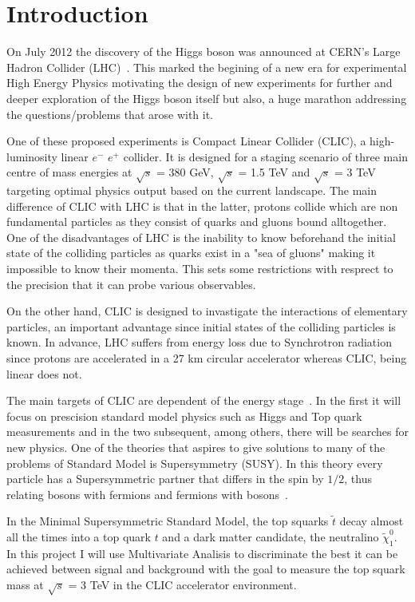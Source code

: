 \documentclass[12pt,a4paper]{report}
\begin{document}
\chapter{Introduction}

On July 2012 the discovery of the Higgs boson was announced at CERN's Large Hadron Collider (LHC)~\cite{aad2012observation}. 
This marked the begining of a new era for experimental High Energy Physics motivating the design of new 
experiments for further and deeper exploration of the Higgs boson itself but also, a huge marathon
addressing the questions/problems that arose with it. 

One of these proposed experiments is Compact Linear Collider (CLIC), a high-luminosity linear $e^{-}$ $e^{+}$ collider. It is designed for a staging scenario of three main centre of mass energies at $\surd{s}$ = 380 GeV, $\surd{s}$ = 1.5 TeV
and $\surd{s}$ = 3 TeV targeting optimal physics output based on the current landscape. The main difference of CLIC with LHC is that in the latter, protons collide which are non fundamental particles as they consist of quarks and 
gluons bound alltogether. One of the disadvantages of LHC is the inability to know beforehand the initial state of the colliding particles as quarks exist in a "sea of gluons" making it impossible to know their momenta. This sets
some restrictions with resprect to the precision that it can probe various observables.

On the other hand, CLIC is designed to invastigate the interactions of elementary particles, an important advantage since initial states of the colliding particles is known. In advance, LHC suffers from energy loss due to 
Synchrotron radiation since protons are accelerated in a 27 km circular accelerator whereas CLIC, being linear does not.

The main targets of CLIC are dependent of the energy stage~\cite{clic2016updated}.
In the first it will focus on prescision standard model physics such as Higgs and Top quark measurements and in the two subsequent, among others, there will be searches
for new physics. One of the theories that aspires to give solutions to many of the problems of Standard Model is Supersymmetry (SUSY). In this theory every particle has a Supersymmetric partner that differs in the spin by $1/2$, thus 
relating bosons with fermions and fermions with bosons~\cite{bilal2001introduction}.

In the Minimal Supersymmetric Standard Model, the top squarks $\tilde{t}$ decay almost all the times into a top quark $t$
and a dark matter candidate, the neutralino $\tilde{\chi}_{1}^{0}$. In this project I will use Multivariate Analisis
to discriminate the best it can be achieved between signal and background with the goal to measure the top squark
mass at $\surd{s}$ = 3 TeV in the CLIC accelerator environment.
\end{document}
